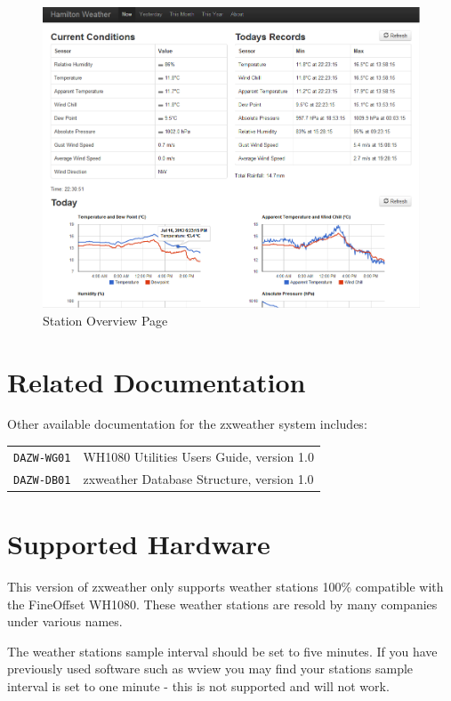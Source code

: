 \documentclass[a4paper,10pt,draft]{book}
\begin{document}
\begin {figure}[!ht]
 \centering
 \includegraphics[scale=0.574]{images/stat_overview}
 \caption{Station Overview Page}
 \label{img_station_overview}
\end {figure}

\section{Related Documentation}
Other available documentation for the zxweather system includes:

\begin{tabular}{l l}
\verb|DAZW-WG01| & WH1080 Utilities Users Guide, version 1.0 \\
\verb|DAZW-DB01| & zxweather Database Structure, version 1.0 \\
\end{tabular}

\section{Supported Hardware}
This version of zxweather only supports weather stations 100\% compatible with the FineOffset WH1080. These weather stations are resold by many companies under various names.

The weather stations sample interval should be set to five minutes. If you have previously used software such as wview you may find your stations sample interval is set to one minute - this is not supported and will not work.
\end{document}
